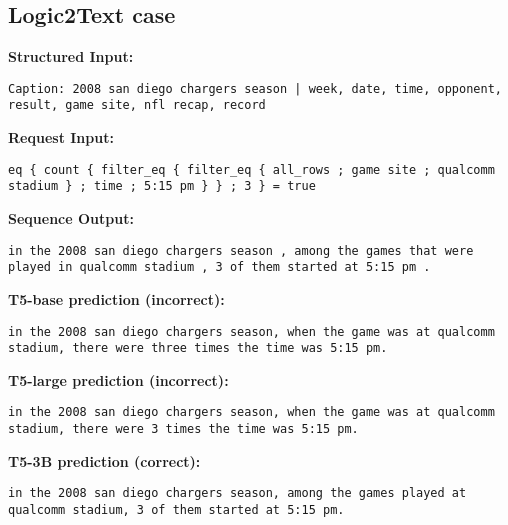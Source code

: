 \documentclass[11pt]{article}
\begin{document}
\subsection{Logic2Text case}
\label{app:logic2text_case}
\textbf{Structured Input:} 
\begin{lstlisting}
Caption: 2008 san diego chargers season | week, date, time, opponent, result, game site, nfl recap, record
\end{lstlisting}
\textbf{Request Input:} 
\begin{lstlisting}
eq { count { filter_eq { filter_eq { all_rows ; game site ; qualcomm stadium } ; time ; 5:15 pm } } ; 3 } = true
\end{lstlisting}
\textbf{Sequence Output:} 
\begin{lstlisting}
in the 2008 san diego chargers season , among the games that were played in qualcomm stadium , 3 of them started at 5:15 pm .
\end{lstlisting}
\textbf{T5-base prediction (incorrect):} 
\begin{lstlisting}
in the 2008 san diego chargers season, when the game was at qualcomm stadium, there were three times the time was 5:15 pm.
\end{lstlisting}
\textbf{T5-large prediction (incorrect):} 
\begin{lstlisting}
in the 2008 san diego chargers season, when the game was at qualcomm stadium, there were 3 times the time was 5:15 pm.
\end{lstlisting}
\textbf{T5-3B prediction (correct):} 
\begin{lstlisting}
in the 2008 san diego chargers season, among the games played at qualcomm stadium, 3 of them started at 5:15 pm.
\end{lstlisting}
\end{document}
